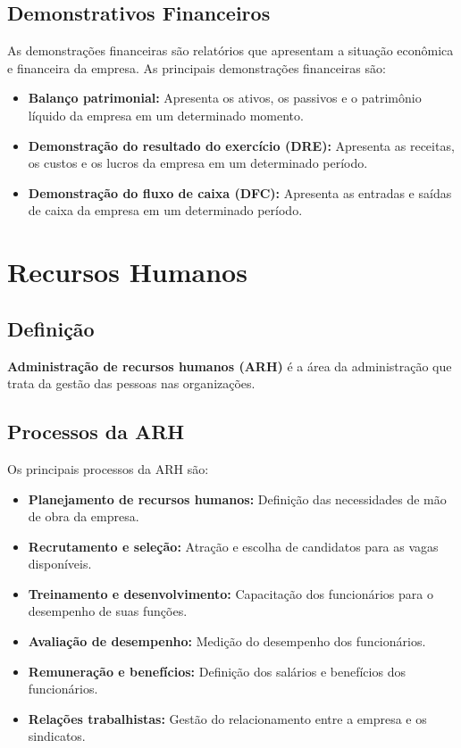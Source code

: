 \documentclass{article}
\begin{document}
\subsection{Demonstrativos Financeiros}
As demonstrações financeiras são relatórios que apresentam a situação econômica e financeira da empresa. As principais demonstrações financeiras são:
\begin{itemize}
    \item \textbf{Balanço patrimonial:} Apresenta os ativos, os passivos e o patrimônio líquido da empresa em um determinado momento.
    \item \textbf{Demonstração do resultado do exercício (DRE):} Apresenta as receitas, os custos e os lucros da empresa em um determinado período.
    \item \textbf{Demonstração do fluxo de caixa (DFC):} Apresenta as entradas e saídas de caixa da empresa em um determinado período.
\end{itemize}

\section{Recursos Humanos}

\subsection{Definição}
\textbf{Administração de recursos humanos (ARH)} é a área da administração que trata da gestão das pessoas nas organizações.

\subsection{Processos da ARH}
Os principais processos da ARH são:
\begin{itemize}
    \item \textbf{Planejamento de recursos humanos:} Definição das necessidades de mão de obra da empresa.
    \item \textbf{Recrutamento e seleção:} Atração e escolha de candidatos para as vagas disponíveis.
    \item \textbf{Treinamento e desenvolvimento:} Capacitação dos funcionários para o desempenho de suas funções.
    \item \textbf{Avaliação de desempenho:} Medição do desempenho dos funcionários.
    \item \textbf{Remuneração e benefícios:} Definição dos salários e benefícios dos funcionários.
    \item \textbf{Relações trabalhistas:} Gestão do relacionamento entre a empresa e os sindicatos.
\end{itemize}
\end{document}
